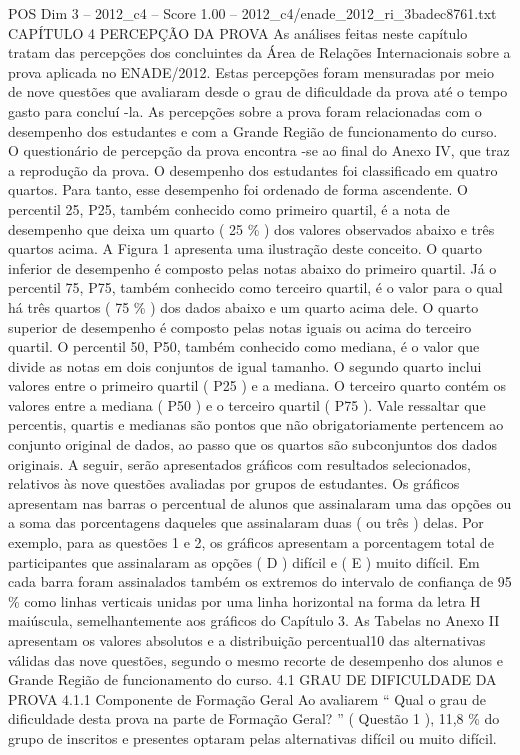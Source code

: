 \begin{textsample}{POS Dim 3 – 2012\_c4 – Score 1.00 – 2012\_c4/enade\_2012\_ri\_3badec8761.txt}  \label{ex:f3_pos_154}
CAPÍTULO 4 PERCEPÇÃO DA PROVA As análises feitas neste capítulo tratam das percepções dos concluintes da Área de Relações Internacionais sobre a prova aplicada no ENADE/2012.
Estas percepções foram mensuradas por meio de nove questões que avaliaram desde o grau de dificuldade da prova até o tempo gasto para concluí -la.
As percepções sobre a prova foram relacionadas com o desempenho dos estudantes e com a Grande Região de funcionamento do curso.
O questionário de percepção da prova encontra -se ao final do Anexo IV, que traz a reprodução da prova.
O desempenho dos estudantes foi classificado em quatro quartos.
Para tanto, esse desempenho foi ordenado de forma ascendente.
O percentil 25, P25, também conhecido como primeiro quartil, é a nota de desempenho que deixa um quarto ( 25 \% ) dos valores observados abaixo e três quartos acima.
A Figura 1 apresenta uma ilustração deste conceito.
O quarto inferior de desempenho é composto pelas notas abaixo do primeiro quartil.
Já o percentil 75, P75, também conhecido como terceiro quartil, é o valor para o qual há três quartos ( 75 \% ) dos dados abaixo e um quarto acima dele.
O quarto superior de desempenho é composto pelas notas iguais ou acima do terceiro quartil.
O percentil 50, P50, também conhecido como mediana, é o valor que divide as notas em dois conjuntos de igual tamanho.
O segundo quarto inclui valores entre o primeiro quartil ( P25 ) e a mediana.
O terceiro quarto contém os valores entre a mediana ( P50 ) e o terceiro quartil ( P75 ).
Vale ressaltar que percentis, quartis e medianas são pontos que não obrigatoriamente pertencem ao conjunto original de dados, ao passo que os quartos são subconjuntos dos dados originais.
A seguir, serão apresentados gráficos com resultados selecionados, relativos às nove questões avaliadas por grupos de estudantes.
Os gráficos apresentam nas barras o percentual de alunos que assinalaram uma das opções ou a soma das porcentagens daqueles que assinalaram duas ( ou três ) delas.
Por exemplo, para as questões 1 e 2, os gráficos apresentam a porcentagem total de participantes que assinalaram as opções ( D ) difícil e ( E ) muito difícil.
Em cada barra foram assinalados também os extremos do intervalo de confiança de 95 \% como linhas verticais unidas por uma linha horizontal na forma da letra H maiúscula, semelhantemente aos gráficos do Capítulo 3.
As Tabelas no Anexo II apresentam os valores absolutos e a distribuição percentual10 das alternativas válidas das nove questões, segundo o mesmo recorte de desempenho dos alunos e Grande Região de funcionamento do curso. 4.1 GRAU DE DIFICULDADE DA PROVA 4.1.1 Componente de Formação Geral Ao avaliarem “ Qual o grau de dificuldade desta prova na parte de Formação Geral? ” ( Questão 1 ), 11,8 \% do grupo de inscritos e presentes optaram pelas alternativas difícil ou muito difícil.

\end{textsample}
